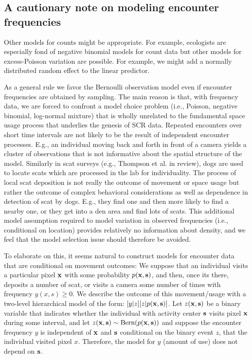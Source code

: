 \subsection{A cautionary note on modeling encounter frequencies}

Other models for counts might be appropriate. For example, ecologists
are especially fond of negative binomial models for count data
\citep{verhoef_boveng:2007,white_bennetts:1996,kery_etal:2005}
but other models for excess-Poisson variation are possible. For
example, we might add a normally distributed random effect to
the linear predictor.

As a general rule we favor the Bernoulli observation model even if
encounter frequencies are obtained by sampling.  The main reason is
that, with frequency data, we are forced to confront a model choice
problem (i.e., Poisson, negative binomial, log-normal mixture) that is
wholly unrelated to the fundamental space usage process that underlies
the genesis of SCR data. Repeated encounters over short time intervals
are not likely to be the result of independent encounter
processes. E.g., an individual moving back and forth in front of a
camera yields a cluster of observations that is not informative about
the spatial structure of the model. Similarly in scat surveys (e.g.,
Thompson et al. in review), dogs are used to locate scats which are
processed in the lab for individuality.  The process of local scat
deposition is not really the outcome of movement or space usage but rather the
outcome of complex behavioral considerations as well as dependence in
detection of scat by dogs. E.g., they find one and then more likely to
find a nearby one, or they get into a den area and find lots of scats.
This additional model assumption required to model variation in
observed frequencies (i.e., conditional on location) provides
relatively no information about density, and we feel that the
model selection issue should therefore be avoided.

To elaborate on this, it seems natural to construct models for
encounter data that are conditional on movement outcomes: We suppose
that an individual visits a particular pixel ${\bf x}$ with some probability
$p({\bf x}, {\bf s})$,
 and then, once its
there, deposits a
number of scat, or visits a camera some number of times with frequency
$y(x,s) \ge 0$.
We describe the outcome of this movement/usage with
a two-level hierarchical model of the form:
$[y|z][z|p({\bf x},{\bf s})]$.
Let $z({\bf x},{\bf s})$ be a binary variable
that indicates whether the individual with activity center ${\bf s}$
visits pixel ${\bf x}$ during some interval, and let
$z({\bf x},{\bf s}) \sim  \mbox{Bern}(p({\bf x},{\bf s}))$ and
suppose
 the encounter frequency $y$ is independent of ${\bf x}$ and
${\bf s}$ conditional
on the binary event $z$,  that the individual visited pixel $x$.
Therefore, the model for $y$ (amount of use) does not
depend on ${\bf s}$.

